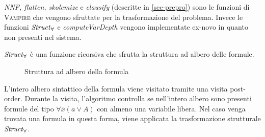 \emph{NNF, flatten, skolemize} e \emph{clausify} (descritte in \ref{sec-prepro}) sono le funzioni di 
\textsc{Vampire} che vengono sfruttate per la trasformazione del problema.
Invece le funzioni $\text{\emph{Struct}}_\forall$ e \emph{computeVarDepth} vengono implementate ex-novo in quanto non presenti 
nel sistema. 

$\text{\emph{Struct}}_\forall$ è una funzione ricorsiva che sfrutta la struttura ad albero delle formule.
\begin{figure}[H]
    \caption{Struttura ad albero della formula}
\end{figure}
L'intero albero sintattico della formula viene visitato tramite una visita post-order. Durante la visita, l'algoritmo 
controlla se nell'intero albero sono presenti formule del tipo $\forall \bar{x}(a \lor A)$ con almeno una variabile libera.
Nel caso venga trovata una formula in questa forma, viene applicata la trasformazione strutturale 
$\text{\emph{Struct}}_\forall$.

